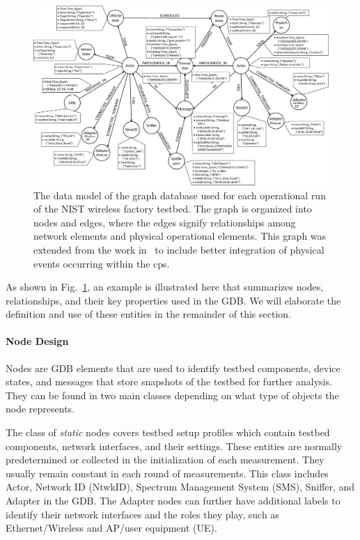\begin{figure}
	\centering
	\includegraphics[width=\textwidth]{chapter-gdb-appl/figures/graph_schema_1209.eps}
	\caption{The data model of the graph database used for each operational run of the NIST wireless factory testbed.  The graph is organized into nodes and edges, where the edges signify relationships among network elements and physical operational elements.  This graph was extended from the work in~\cite{CandellISIT2020.Conf} to include better integration of physical events occurring within the \gls{cps}. }
	\label{gdbappl:fig:database:schema}
\end{figure}

As shown in Fig.~\ref{gdbappl:fig:database:schema}, an example is illustrated here that summarizes nodes, relationships, and their key properties used in the GDB. We will elaborate the definition and use of these entities in the remainder of this section.			


\paragraph{Node Design}

Nodes are GDB elements that are used to identify testbed components, device states, and messages that store snapshots of the testbed for further analysis. They can be found in two main classes depending on what type of objects the node represents.

The class of \textit{static} nodes covers testbed setup profiles which contain testbed components, network interfaces, and their settings. These entities are normally predetermined or collected in the initialization of each measurement. They usually remain constant in each round of measurements. This class includes Actor, Network ID (NtwkID), Spectrum Management System (SMS), Sniffer, and Adapter in the GDB. The Adapter nodes can further have additional labels to identify their network interfaces and the roles they play, such as Ethernet/Wireless and AP/user equipment (UE).


